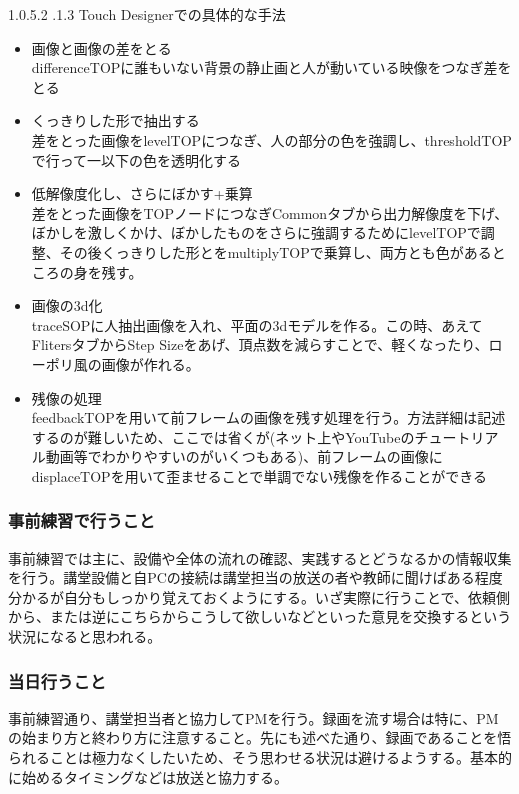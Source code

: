 \documentclass[dvipdfmx,jb5]{jarticle}
\makeatletter
\newcommand{\subsubsubsection}{\@startsection{paragraph}{4}{\z@}%
    {1.0\Cvs \@plus.5\Cdp \@minus.2\Cdp}%
    {.1\Cvs \@plus.3\Cdp}%
    {\large \bfseries}
  }
\makeatother
\begin{document}
\subsubsubsection{Touch Designerでの具体的な手法}
\begin{itemize}
\item 画像と画像の差をとる\\
differenceTOPに誰もいない背景の静止画と人が動いている映像をつなぎ差をとる
\item くっきりした形で抽出する\\
差をとった画像をlevelTOPにつなぎ、人の部分の色を強調し、thresholdTOPで行って一以下の色を透明化する
\item 低解像度化し、さらにぼかす+乗算\\
差をとった画像をTOPノードにつなぎCommonタブから出力解像度を下げ、ぼかしを激しくかけ、ぼかしたものをさらに強調するためにlevelTOPで調整、その後くっきりした形とをmultiplyTOPで乗算し、両方とも色があるところの身を残す。
\item 画像の3d化\\
traceSOPに人抽出画像を入れ、平面の3dモデルを作る。この時、あえてFlitersタブからStep Sizeをあげ、頂点数を減らすことで、軽くなったり、ローポリ風の画像が作れる。
\item 残像の処理\\
feedbackTOPを用いて前フレームの画像を残す処理を行う。方法詳細は記述するのが難しいため、ここでは省くが(ネット上やYouTubeのチュートリアル動画等でわかりやすいのがいくつもある)、前フレームの画像にdisplaceTOPを用いて歪ませることで単調でない残像を作ることができる
\end{itemize}

\subsubsection{事前練習で行うこと}
事前練習では主に、設備や全体の流れの確認、実践するとどうなるかの情報収集を行う。講堂設備と自PCの接続は講堂担当の放送の者や教師に聞けばある程度分かるが自分もしっかり覚えておくようにする。いざ実際に行うことで、依頼側から、または逆にこちらからこうして欲しいなどといった意見を交換するという状況になると思われる。

\subsubsection{当日行うこと}
事前練習通り、講堂担当者と協力してPMを行う。録画を流す場合は特に、PMの始まり方と終わり方に注意すること。先にも述べた通り、録画であることを悟られることは極力なくしたいため、そう思わせる状況は避けるようする。基本的に始めるタイミングなどは放送と協力する。
\end{document}
